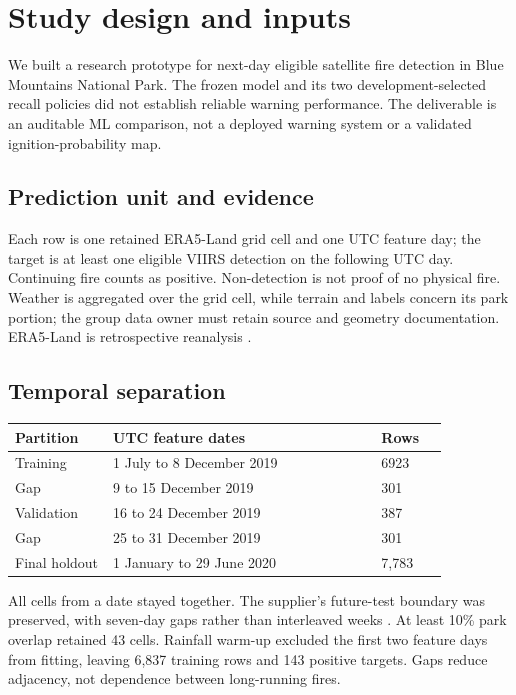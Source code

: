 \clearpage
\section*{Study design and inputs}
We built a research prototype for next-day eligible satellite fire detection in Blue Mountains National Park. The frozen model and its two development-selected recall policies did not establish reliable warning performance. The deliverable is an auditable ML comparison, not a deployed warning system or a validated ignition-probability map.

\subsection*{Prediction unit and evidence}

Each row is one retained ERA5-Land grid cell and one UTC feature day; the target is at least one eligible VIIRS detection on the following UTC day. Continuing fire counts as positive. Non-detection is not proof of no physical fire. Weather is aggregated over the grid cell, while terrain and labels concern its park portion; the group data owner must retain source and geometry documentation. ERA5-Land is retrospective reanalysis \cite{mlERA5Land}.

\subsection*{Temporal separation}

\begin{center}\small\setlength{\tabcolsep}{3pt}
\begin{tabular}{p{0.198\linewidth}p{0.525\linewidth}p{0.138\linewidth}}
\hline
Partition & UTC feature dates & Rows \\ \hline
Training & 1 July to 8 December 2019 & 6923 \\
Gap & 9 to 15 December 2019 & 301 \\
Validation & 16 to 24 December 2019 & 387 \\
Gap & 25 to 31 December 2019 & 301 \\
Final holdout & 1 January to 29 June 2020 & 7,783 \\
\hline\end{tabular}\end{center}

All cells from a date stayed together. The supplier's future-test boundary was preserved, with seven-day gaps rather than interleaved weeks \cite{mlTemporalEvaluation}. At least 10\% park overlap retained 43 cells. Rainfall warm-up excluded the first two feature days from fitting, leaving 6,837 training rows and 143 positive targets. Gaps reduce adjacency, not dependence between long-running fires.

